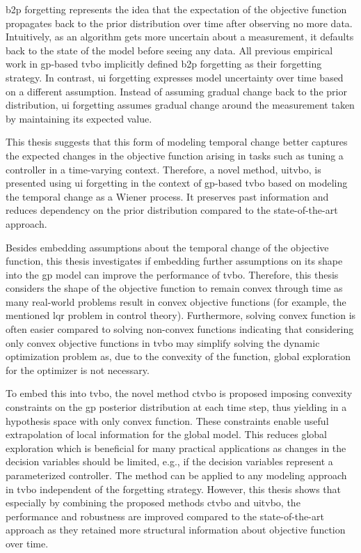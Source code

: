 \gls{b2p} forgetting represents the idea that the expectation of the objective function propagates back to the prior distribution over time after observing no more data. Intuitively, as an algorithm gets more uncertain about a measurement, it defaults back to the state of the model before seeing any data. All previous empirical work in \gls{gp}-based \gls{tvbo} implicitly defined \gls{b2p} forgetting as their forgetting strategy. In contrast, \gls{ui} forgetting expresses model uncertainty over time based on a different assumption. Instead of assuming gradual change back to the prior distribution, \gls{ui} forgetting assumes gradual change around the measurement taken by maintaining its expected value.

This thesis suggests that this form of modeling temporal change better captures the expected changes in the objective function arising in tasks such as tuning a controller in a time-varying context.
Therefore, a novel method, \gls{uitvbo}, is presented using \gls{ui} forgetting in the context of \gls{gp}-based \gls{tvbo} based on modeling the temporal change as a Wiener process. It preserves past information and reduces dependency on the prior distribution compared to the state-of-the-art approach.

Besides embedding assumptions about the temporal change of the objective function, this thesis investigates if embedding further assumptions on its shape into the \gls{gp} model can improve the performance of \gls{tvbo}. Therefore, this thesis considers the shape of the objective function to remain convex through time as many real-world problems result in convex objective functions (for example, the mentioned \gls{lqr} problem in control theory). Furthermore, solving convex function is often easier compared to solving non-convex functions \cite{Boyd_2004} indicating that considering only convex objective functions in \gls{tvbo} may simplify solving the dynamic optimization problem as, due to the convexity of the function, global exploration for the optimizer is not necessary.

To embed this into \gls{tvbo}, the novel method \gls{ctvbo} is proposed imposing convexity constraints on the \gls{gp} posterior distribution at each time step, thus yielding in a hypothesis space with only convex function. These constraints enable useful extrapolation of local information for the global model. This reduces global exploration which is beneficial for many practical applications as changes in the decision variables should be limited, e.g., if the decision variables represent a parameterized controller. The method can be applied to any modeling approach in \gls{tvbo} independent of the forgetting strategy. However, this thesis shows that especially by combining the proposed methods \gls{ctvbo} and \gls{uitvbo}, the performance and robustness are improved compared to the state-of-the-art approach as they retained more structural information about objective function over time.

